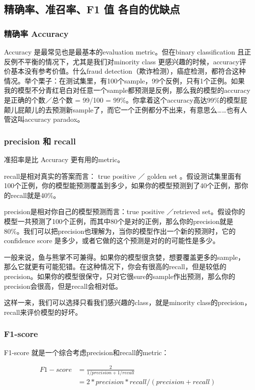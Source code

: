 \documentclass[12pt]{article}
\begin{document}
\subsection{精确率、准召率、F1 值 各自的优缺点\cite{Compare_P_R_F1_ROC_AUC}}

\subsubsection{精确率 Accuracy}
Accuracy 是最常见也是最基本的evaluation metric。但在binary classification 且正反例不平衡的情况下，尤其是我们对minority class 更感兴趣的时候，accuracy评价基本没有参考价值。什么fraud detection（欺诈检测），癌症检测，都符合这种情况。举个栗子：在测试集里，有100个sample，99个反例，只有1个正例。如果我的模型不分青红皂白对任意一个sample都预测是反例，那么我的模型的accuracy是正确的个数／总个数 = 99/100 = 99\%。你拿着这个accuracy高达99\%的模型屁颠儿屁颠儿的去预测新sample了，而它一个正例都分不出来，有意思么……也有人管这叫accuracy paradox。

\subsubsection{precision 和 recall}
准招率是比 Accuracy 更有用的metric。

recall是相对真实的答案而言： true positive ／ golden set 。假设测试集里面有100个正例，你的模型能预测覆盖到多少，如果你的模型预测到了40个正例，那你的recall就是40\%。

precision是相对你自己的模型预测而言：true positive ／retrieved set。假设你的模型一共预测了100个正例，而其中80个是对的正例，那么你的precision就是80\%。我们可以把precision也理解为，当你的模型作出一个新的预测时，它的confidence score 是多少，或者它做的这个预测是对的的可能性是多少。

一般来说，鱼与熊掌不可兼得。如果你的模型很贪婪，想要覆盖更多的sample，那么它就更有可能犯错。在这种情况下，你会有很高的recall，但是较低的precision。如果你的模型很保守，只对它很sure的sample作出预测，那么你的precision会很高，但是recall会相对低。

这样一来，我们可以选择只看我们感兴趣的class，就是minority class的precision，recall来评价模型的好坏。

\subsubsection{F1-score}
F1-score 就是一个综合考虑precision和recall的metric： 

\begin{align*}
F1-score &= \frac{2}{1/precision + 1/recall}\\
     &= 2 * precision * recall / (precision + recall) 
\end{align*}
\end{document}
